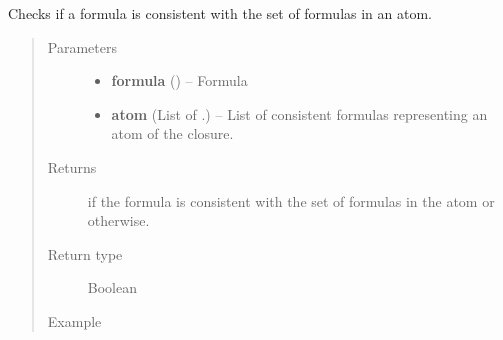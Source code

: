 \documentclass[letterpaper,10pt,english]{sphinxmanual}
\begin{document}
\begin{fulllineitems}


{\hyperref[formula:formula.Formula]{}}



\end{fulllineitems}


\begin{fulllineitems}
\label{modelCheckingGraph:modelCheckingGraph.isConsistent}
Checks if a formula is consistent with the set of formulas in an atom.
\begin{quote}\begin{description}
\item[{Parameters}] \leavevmode\begin{itemize}
\item {} 
\textbf{formula} ({\hyperref[formula:formula.Formula]{}}) -- Formula

\item {} 
\textbf{atom} (List of {\hyperref[formula:formula.Formula]{}}.) -- List of consistent formulas representing an atom of the closure.

\end{itemize}

\item[{Returns}] \leavevmode
{} if the formula is consistent with the set of formulas in the atom or  otherwise.

\item[{Return type}] \leavevmode
Boolean

\item[{Example }] \leavevmode
\end{description}\end{quote}


\end{fulllineitems}
\end{document}
